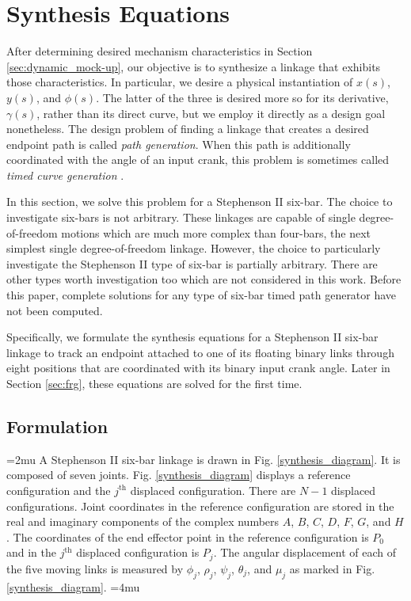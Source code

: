 \documentclass[journal]{IEEEtran}
\begin{document}
\section{Synthesis Equations}
\label{sec:synth_eq}

After determining desired mechanism characteristics in Section \ref{sec:dynamic_mock-up}, our objective is to synthesize a linkage that exhibits those characteristics.
In particular, we desire a physical instantiation of $x(s)$, $y(s)$, and $\phi(s)$.
The latter of the three is desired more so for its derivative, $\gamma(s)$, rather than its direct curve, but we employ it directly as a design goal nonetheless.
The design problem of finding a linkage that creates a desired endpoint path is called \emph{path generation}.
When this path is additionally coordinated with the angle of an input crank, this problem is sometimes called \emph{timed curve generation} \cite{dijksmanMotionGeometryMechanisms1976}.


In this section, we solve this problem for a Stephenson II six-bar.  The choice to investigate six-bars is not arbitrary.  These linkages are capable of single degree-of-freedom motions which are much more complex than four-bars, the next simplest single degree-of-freedom linkage.  However, the choice to particularly investigate the Stephenson II type of six-bar is partially arbitrary.  There are other types worth investigation too which are not considered in this work.  Before this paper, complete solutions for any type of six-bar timed path generator have not been computed.


Specifically, we formulate the synthesis equations for a Stephenson II six-bar linkage to track an endpoint attached to one of its floating binary links through eight positions that are coordinated with its binary input crank angle.
Later in Section \ref{sec:frg}, these equations are solved for the first time.


\subsection{Formulation}
\label{sec:synth_form}

\medmuskip=2mu
A Stephenson II six-bar linkage is drawn in Fig. \ref{synthesis_diagram}.  It is composed of seven joints.  Fig. \ref{synthesis_diagram} displays a reference configuration and the $j^\text{th}$ displaced configuration.  There are $N-1$ displaced configurations.  Joint coordinates in the reference configuration are stored in the real and imaginary components of the complex numbers $A$, $B$, $C$, $D$, $F$, $G$, and $H$.  The coordinates of the end effector point in the reference configuration is $P_0$ and in the $j^\text{th}$ displaced configuration is $P_j$.  The angular displacement of each of the five moving links is measured by $\phi_j$, $\rho_j$, $\psi_j$, $\theta_j$, and $\mu_j$ as marked in Fig. \ref{synthesis_diagram}.
\medmuskip=4mu
\end{document}
